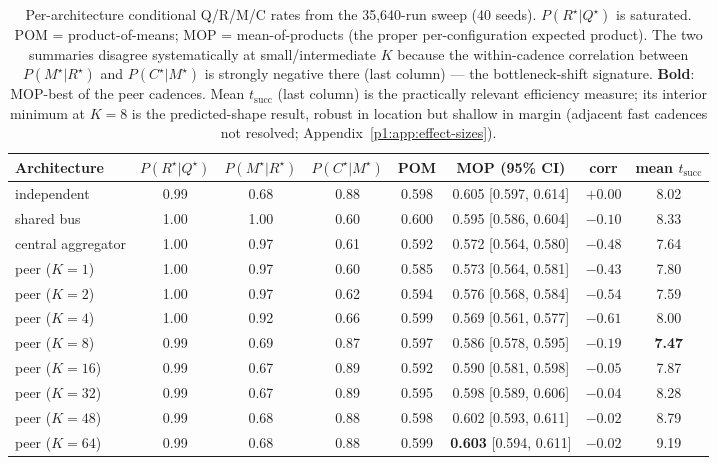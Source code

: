 \documentclass{article}
\begin{document}
\begin{table}[h]
\caption{Per-architecture conditional Q/R/M/C rates from the 35{,}640-run sweep (40 seeds). $P(R^\star|Q^\star)$ is saturated. POM = product-of-means; MOP = mean-of-products (the proper per-configuration expected product). The two summaries disagree systematically at small/intermediate $K$ because the within-cadence correlation between $P(M^\star|R^\star)$ and $P(C^\star|M^\star)$ is strongly negative there (last column) --- the bottleneck-shift signature. \textbf{Bold}: MOP-best of the peer cadences. Mean $t_{\mathrm{succ}}$ (last column) is the practically relevant efficiency measure; its interior minimum at $K=8$ is the predicted-shape result, robust in location but shallow in margin (adjacent fast cadences not resolved; Appendix~\ref{p1:app:effect-sizes}).}
\label{p1:tab:multi-agent-cond}
\centering
\scriptsize
\setlength{\tabcolsep}{3.5pt}
\begin{tabular}{l c c c c c c c}
\toprule
Architecture & $P(R^\star|Q^\star)$ & $P(M^\star|R^\star)$ & $P(C^\star|M^\star)$ & POM & MOP (95\% CI) & corr & mean $t_{\mathrm{succ}}$ \\
\midrule
independent          & 0.99 & 0.68 & 0.88 & 0.598 & 0.605 [0.597, 0.614] & $+0.00$ & 8.02 \\
shared bus           & 1.00 & 1.00 & 0.60 & 0.600 & 0.595 [0.586, 0.604] & $-0.10$ & 8.33 \\
central aggregator   & 1.00 & 0.97 & 0.61 & 0.592 & 0.572 [0.564, 0.580] & $-0.48$ & 7.64 \\
peer ($K=1$)         & 1.00 & 0.97 & 0.60 & 0.585 & 0.573 [0.564, 0.581] & $-0.43$ & 7.80 \\
peer ($K=2$)         & 1.00 & 0.97 & 0.62 & 0.594 & 0.576 [0.568, 0.584] & $-0.54$ & 7.59 \\
peer ($K=4$)         & 1.00 & 0.92 & 0.66 & 0.599 & 0.569 [0.561, 0.577] & $-0.61$ & 8.00 \\
peer ($K=8$)         & 0.99 & 0.69 & 0.87 & 0.597 & 0.586 [0.578, 0.595] & $-0.19$ & \textbf{7.47} \\
peer ($K=16$)        & 0.99 & 0.67 & 0.89 & 0.592 & 0.590 [0.581, 0.598] & $-0.05$ & 7.87 \\
peer ($K=32$)        & 0.99 & 0.67 & 0.89 & 0.595 & 0.598 [0.589, 0.606] & $-0.04$ & 8.28 \\
peer ($K=48$)        & 0.99 & 0.68 & 0.88 & 0.598 & 0.602 [0.593, 0.611] & $-0.02$ & 8.79 \\
peer ($K=64$)        & 0.99 & 0.68 & 0.88 & 0.599 & \textbf{0.603} [0.594, 0.611] & $-0.02$ & 9.19 \\
\bottomrule
\end{tabular}
\end{table}
\end{document}
